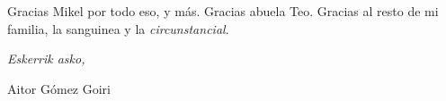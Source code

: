 \begin{acknowledgements}
Gracias Mikel por todo eso, y más.
Gracias abuela Teo.
Gracias al resto de mi familia, la sanguinea y la \emph{circunstancial}.



\begin{flushright}
\textit{Eskerrik asko,}

Aitor Gómez Goiri

\monthname \ \the\year







\end{flushright}



\end{acknowledgements}



